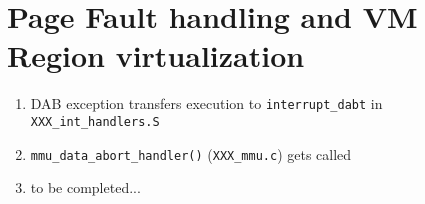 \section{Page Fault handling and VM Region virtualization}

\begin{enumerate}
\item DAB exception transfers execution to \verb+interrupt_dabt+ in \verb+XXX_int_handlers.S+
\item \verb+mmu_data_abort_handler()+ (\verb+XXX_mmu.c+) gets called
\item to be completed...
\end{enumerate}
